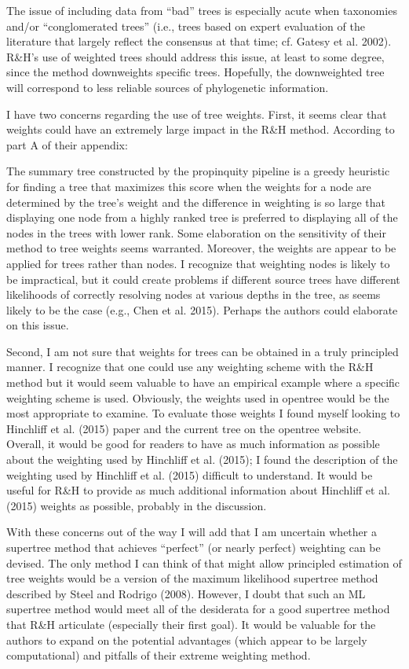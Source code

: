 \documentclass{article}
\renewenvironment{quote}
               {\list{}{\rightmargin\leftmargin}%
                \item\relax\normalfont}
               {\endlist}
\begin{document}
The issue of including data from “bad” trees is especially acute when taxonomies and/or “conglomerated trees” (i.e., trees based on expert evaluation of the literature that largely reflect the consensus at that time; cf. Gatesy et al. 2002). R\&H’s use of weighted trees should address this issue, at least to some degree, since the method downweights specific trees. Hopefully, the downweighted tree will correspond to less reliable sources of phylogenetic information.

I have two concerns regarding the use of tree weights. First, it seems clear that weights could have an extremely large impact in the R\&H method. According to part A of their appendix:
\begin{quote}
The summary tree constructed by the propinquity pipeline is a greedy heuristic for finding a tree that maximizes this score when the weights for a node are determined by the tree’s weight and the difference in weighting is so large that displaying one node from a highly ranked tree is preferred to displaying all of the nodes in the trees with lower rank.
\end{quote}
Some elaboration on the sensitivity of their method to tree weights seems warranted. Moreover, the weights are appear to be applied for trees rather than nodes. I recognize that weighting nodes is likely to be impractical, but it could create problems if different source trees have different likelihoods of correctly resolving nodes at various depths in the tree, as seems likely to be the case (e.g., Chen et al. 2015). Perhaps the authors could elaborate on this issue.

Second, I am not sure that weights for trees can be obtained in a truly principled manner. I recognize that one could use any weighting scheme with the R\&H method but it would seem valuable to have an empirical example where a specific weighting scheme is used. Obviously, the weights used in opentree would be the most appropriate to examine. To evaluate those weights I found myself looking to Hinchliff et al. (2015) paper and the current tree on the opentree website. Overall, it would be good for readers to have as much information as possible about the weighting used by Hinchliff et al. (2015); I found the description of the weighting used by Hinchliff et al. (2015) difficult to understand. It would be useful for R\&H to provide as much additional information about Hinchliff et al. (2015) weights as possible, probably in the discussion.

With these concerns out of the way I will add that I am uncertain whether a supertree method that achieves “perfect” (or nearly perfect) weighting can be devised. The only method I can think of that might allow principled estimation of tree weights would be a version of the maximum likelihood supertree method described by Steel and Rodrigo (2008). However, I doubt that such an ML supertree method would meet all of the desiderata for a good supertree method that R\&H articulate (especially their first goal). It would be valuable for the authors to expand on the potential advantages (which appear to be largely computational) and pitfalls of their extreme weighting method.
\end{document}
